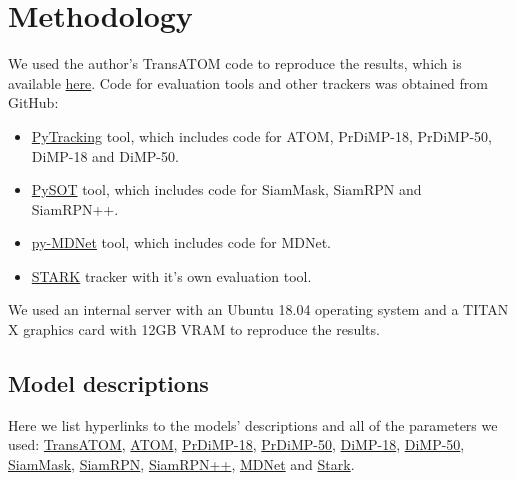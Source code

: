 \section{Methodology}
We used the author's TransATOM code to reproduce the results, which is available \href{https://hengfan2010.github.io/projects/TOTB/}{here}. Code for evaluation tools and other trackers was obtained from GitHub:
\begin{itemize}
\item \href{https://github.com/visionml/pytracking}{PyTracking} tool, which includes code for ATOM, PrDiMP-18, PrDiMP-50, DiMP-18 and DiMP-50.
\item \href{https://github.com/STVIR/pysot}{PySOT} tool, which includes code for SiamMask, SiamRPN and SiamRPN++.
\item \href{https://github.com/HyeonseobNam/py-MDNet}{py-MDNet} tool, which includes code for MDNet.
\item \href{https://github.com/researchmm/Stark}{STARK} tracker with it's own evaluation tool.
\end{itemize}
We used an internal server with an Ubuntu 18.04 operating system and a TITAN X graphics card with 12GB VRAM to reproduce the results.


\subsection{Model descriptions}
Here we list hyperlinks to the models' descriptions and all of the parameters we used: \href{https://github.com/visionml/pytracking/blob/master/pytracking/parameter/atom/default.py}{TransATOM}, \href{https://github.com/visionml/pytracking/blob/master/pytracking/parameter/atom/default.py}{ATOM}, \href{https://github.com/visionml/pytracking/blob/master/pytracking/parameter/dimp/prdimp18.py}{PrDiMP-18}, \href{https://github.com/visionml/pytracking/blob/master/pytracking/parameter/dimp/prdimp50.py}{PrDiMP-50}, \href{https://github.com/visionml/pytracking/blob/master/pytracking/parameter/dimp/dimp18.py}{DiMP-18}, \href{https://github.com/visionml/pytracking/blob/master/pytracking/parameter/dimp/dimp50.py}{DiMP-50}, \href{https://github.com/STVIR/pysot/blob/master/experiments/siammask_r50_l3/config.yaml}{SiamMask}, \href{https://github.com/STVIR/pysot/blob/master/experiments/siamrpn_alex_dwxcorr_otb/config.yaml}{SiamRPN}, \href{https://github.com/STVIR/pysot/blob/master/experiments/siamrpn_r50_l234_dwxcorr_otb/config.yaml}{SiamRPN++}, \href{https://github.com/hyeonseobnam/py-MDNet/blob/master/tracking/options.yaml}{MDNet} and \href{https://github.com/researchmm/Stark/blob/main/lib/config/stark_s/config.py}{Stark}.

